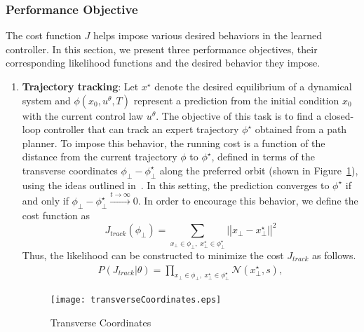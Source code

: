 \subsubsection{Performance Objective}
\label{sssec:cost}

The cost function $J$ helps impose various desired behaviors in the learned
controller. In this section, we present three performance objectives, their
corresponding likelihood functions and the desired behavior they impose.

\begin{enumerate}
    \item \textbf{Trajectory tracking}: Let $x^\star$ denote the desired equilibrium of a
    dynamical system and $\phi(x_0, u^\theta, T)$ represent a
    prediction from the initial condition $x_0$ with the current control law
    $u^\theta$. The objective of this task is to find a closed-loop controller
    that can track an expert trajectory $\phi^\star$ obtained from a path
    planner. To impose this behavior, the running cost is a function of the
    distance from the current trajectory $\phi$ to $\phi^\star$, defined in
    terms of the transverse coordinates $\phi_\bot-\phi^\star_\bot$ along
    the preferred orbit (shown in Figure~\ref{fig:transverse}), using the ideas outlined
    in~\cite{shiriaev2009transverse,manchester2010transverse}. In this setting,
    the prediction converges to $\phi^\star$ if and only if
    $\phi_\bot-\phi^\star_\bot \xrightarrow{t \to \infty}{} 0$. In order to
    encourage this behavior, we define the cost function as
    \begin{equation}
        J_{track}(\phi_\bot) =  \sum_{x_\bot \in \phi_\bot, \; x^\star_\bot \in \phi^\star_\bot} |\left| x_\bot-x^\star_\bot | \right |^2
        \label{eq:xperploss}   
    \end{equation}
    Thus, the likelihood can be constructed to minimize the cost $J_{track}$ as follows.
    \begin{align}
        P(J_{track} | \theta) = \prod_{x_\bot \in \phi_\bot, \; x^\star_\bot \in \phi^\star_\bot}\mathcal{N}(x^\star_\bot , s),
        \label{eq:track_likelihood}
    \end{align}
    \begin{figure}
        \centering
        \texttt{[image: transverseCoordinates.eps]}
        \caption{Transverse Coordinates}
        \label{fig:transverse}

\end{figure}
\end{enumerate}
